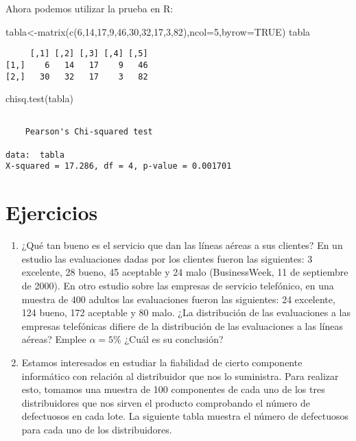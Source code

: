 \documentclass[
  a4paper,
  oneside,
  openany]{book}
\newenvironment{Shaded}{\begin{snugshade}}{\end{snugshade}}
\newcommand{\AttributeTok}[1]{\textcolor[rgb]{0.77,0.63,0.00}{#1}}
\newcommand{\ConstantTok}[1]{\textcolor[rgb]{0.00,0.00,0.00}{#1}}
\newcommand{\DecValTok}[1]{\textcolor[rgb]{0.00,0.00,0.81}{#1}}
\newcommand{\FunctionTok}[1]{\textcolor[rgb]{0.00,0.00,0.00}{#1}}
\newcommand{\NormalTok}[1]{#1}
\newcommand{\OtherTok}[1]{\textcolor[rgb]{0.56,0.35,0.01}{#1}}
\begin{document}
Ahora podemos utilizar la prueba en R:

\begin{Shaded}
\begin{Highlighting}[]
\NormalTok{tabla}\OtherTok{\textless{}{-}}\FunctionTok{matrix}\NormalTok{(}\FunctionTok{c}\NormalTok{(}\DecValTok{6}\NormalTok{,}\DecValTok{14}\NormalTok{,}\DecValTok{17}\NormalTok{,}\DecValTok{9}\NormalTok{,}\DecValTok{46}\NormalTok{,}\DecValTok{30}\NormalTok{,}\DecValTok{32}\NormalTok{,}\DecValTok{17}\NormalTok{,}\DecValTok{3}\NormalTok{,}\DecValTok{82}\NormalTok{),}\AttributeTok{ncol=}\DecValTok{5}\NormalTok{,}\AttributeTok{byrow=}\ConstantTok{TRUE}\NormalTok{)}
\NormalTok{tabla}
\end{Highlighting}
\end{Shaded}

\begin{verbatim}
     [,1] [,2] [,3] [,4] [,5]
[1,]    6   14   17    9   46
[2,]   30   32   17    3   82
\end{verbatim}

\begin{Shaded}
\begin{Highlighting}[]
\FunctionTok{chisq.test}\NormalTok{(tabla)}
\end{Highlighting}
\end{Shaded}

\begin{verbatim}

    Pearson's Chi-squared test

data:  tabla
X-squared = 17.286, df = 4, p-value = 0.001701
\end{verbatim}

\hypertarget{ejercicios-8}{%
\section{Ejercicios}\label{ejercicios-8}}

\begin{enumerate}
\def\labelenumi{\arabic{enumi}.}
\item
  ¿Qué tan bueno es el servicio que dan las líneas aéreas a sus clientes? En un estudio las evaluaciones dadas por los clientes fueron las siguientes: 3 excelente, 28 bueno, 45 aceptable y 24 malo (BusinessWeek, 11 de septiembre de 2000). En otro estudio sobre las empresas de servicio telefónico, en una muestra de 400 adultos las evaluaciones fueron las siguientes: 24 excelente, 124 bueno, 172 aceptable y 80 malo. ¿La distribución de las evaluaciones a las empresas telefónicas difiere de la distribución de las evaluaciones a las líneas aéreas? Emplee \(\alpha=5\%\) ¿Cuál es su conclusión?
\item
  Estamos interesados en estudiar la fiabilidad de cierto componente informático con relación al distribuidor que nos lo suministra. Para realizar esto, tomamos una muestra de 100 componentes de cada uno de los tres distribuidores que nos sirven el producto comprobando el número de defectuosos en cada lote. La siguiente tabla muestra el número de defectuosos para cada uno de los distribuidores.
\end{enumerate}
\end{document}
